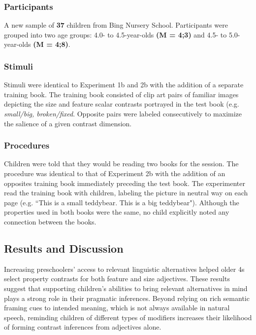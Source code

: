 \documentclass[10pt,letterpaper]{article}
\begin{document}
\subsubsection{Participants}

A new sample of \textbf{37} children from Bing Nursery School. Participants were grouped into two age groups: 4.0- to 4.5-year-olds \textbf{(M = 4;3)} and 4.5- to 5.0-year-olds \textbf{(M = 4;8)}.

\subsubsection{Stimuli}

Stimuli were identical to Experiment 1b and 2b with the addition of a separate training book.  The training book consisted of clip art pairs of familiar images depicting the size and feature scalar contrasts portrayed in the test book (e.g. \emph{small/big, broken/fixed}.  Opposite pairs were labeled consecutively to maximize the salience of a given contrast dimension. 

\subsubsection{Procedures}

Children were told that they would be reading two books for the session.  The procedure was identical to that of Experiment 2b with the addition of an opposites training book immediately preceding the test book. The experimenter read the training book with children, labeling the picture in neutral way on each page (e.g. ``This is a small teddybear. This is a big teddybear").  Although the properties used in both books were the same, no child explicitly noted any connection between the books. 

\subsection{Results and Discussion}

Increasing preschoolers' access to relevant linguistic alternatives helped older 4s select property contrasts for both feature and size adjectives.  These results suggest that supporting children's abilities to bring relevant alternatives in mind plays a strong role in their pragmatic inferences. Beyond relying on rich semantic framing cues to intended meaning, which is not always available in natural speech, reminding children of different types of modifiers increases their likelihood of forming contrast inferences from adjectives alone. 
\end{document}
